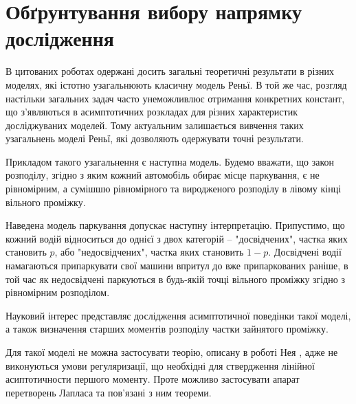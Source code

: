 \section{Обґрунтування вибору напрямку дослідження}

В цитованих роботах одержані досить загальні теоретичні результати в різних моделях, які істотно узагальнюють класичну модель Реньї. В той же час, розгляд настільки загальних задач часто унеможливлює отримання конкретних констант, що з’являються в асимптотичних розкладах для різних характеристик досліджуваних моделей. Тому актуальним залишається вивчення таких узагальнень моделі Реньї, які дозволяють одержувати точні результати.

Прикладом такого узагальнення є наступна модель. Будемо вважати, що закон розподілу, згідно з яким кожний автомобіль обирає місце паркування, є не рівномірним, а сумішшю рівномірного та виродженого розподілу в лівому кінці вільного проміжку.

Наведена модель паркування допускає наступну інтерпретацію. Припустимо, що кожний водій відноситься до однієї з двох категорій – "досвідчених", частка яких становить $p$, або "недосвідчених", частка яких становить $1 - p$. Досвідчені водії намагаються припаркувати свої машини впритул до вже припаркованих раніше, в той час як недосвідчені паркуються в будь-якій точці вільного проміжку згідно з рівномірним розподілом.

Науковий інтерес представляє дослідження асимптотичної поведінки такої моделі, а також визначення старших моментів розподілу частки зайнятого проміжку.

Для такої моделі не можна застосувати теорію, описану в роботі Нея \cite{ney1962}, адже не виконуються умови регуляризації, що необхідні для ствердження лінійної асиптотичности першого моменту. Проте можливо застосувати апарат перетворень Лапласа та пов'язані з ним теореми.
